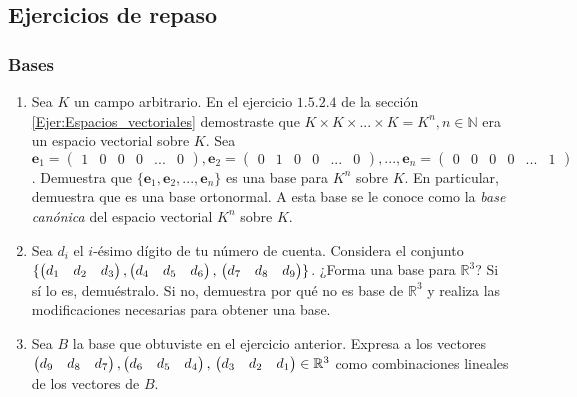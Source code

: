 \documentclass[12pt,dvipsnames]{article}
\begin{document}

\subsection{Ejercicios de repaso}

\subsubsection{Bases}
\begin{enumerate}
    \item Sea $K$ un campo arbitrario. En el ejercicio $1.5.2.4$ de la sección \ref{Ejer:Espacios_vectoriales} demostraste que $K\times K\times ...\times K=K^n, n\in\mathbb{N}$ era un espacio vectorial sobre $K$. Sea $\mathbf{e}_1=\begin{pmatrix} 1 & 0 & 0 & 0 & ... & 0 \end{pmatrix}, \mathbf{e}_2=\begin{pmatrix} 0 & 1 & 0 & 0 & ... & 0 \end{pmatrix}, ..., \mathbf{e}_n = \begin{pmatrix} 0 & 0 & 0 & 0 & ... & 1 \end{pmatrix}$. Demuestra que $\{\mathbf{e}_1, \mathbf{e}_2, ..., \mathbf{e}_n\}$ es una base para $K^n$ sobre $K$. En particular, demuestra que es una base ortonormal. A esta base se le conoce como la \emph{base canónica} del espacio vectorial $K^n$ sobre $K$.  
    \item Sea $d_i$ el $i$-ésimo dígito de tu número de cuenta. Considera el conjunto $\{\begin{pmatrix} d_1&d_2&d_3 \end{pmatrix}, \begin{pmatrix} d_4&d_5&d_6 \end{pmatrix},\\ \begin{pmatrix} d_7&d_8&d_9 \end{pmatrix}\}$. ¿Forma una base para $\mathbb{R}^3$? Si sí lo es, demuéstralo. Si no, demuestra por qué no es base de $\mathbb{R}^3$ y realiza las modificaciones necesarias para obtener una base. 
    \item Sea $B$ la base que obtuviste en el ejercicio anterior. Expresa a los vectores $\begin{pmatrix} d_9&d_8&d_7 \end{pmatrix} , \begin{pmatrix} d_6&d_5&d_4 \end{pmatrix} , \\ \begin{pmatrix} d_3&d_2&d_1 \end{pmatrix} \in \mathbb{R}^3$ como combinaciones lineales de los vectores de $B$. 
\end{enumerate}
\end{document}
